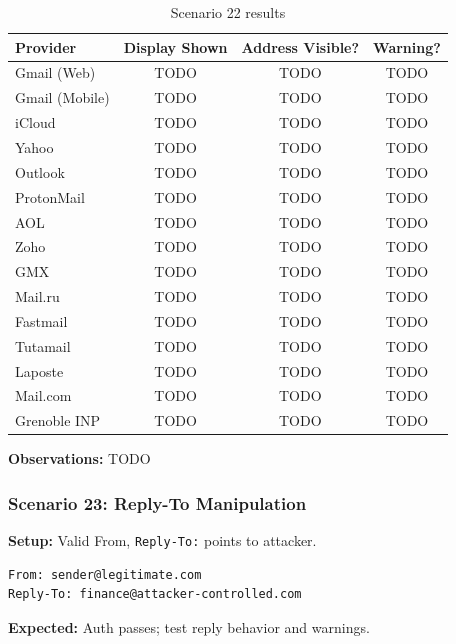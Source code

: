 \documentclass[11pt,a4paper]{article}
\begin{document}
\begin{table}[h]
\centering
\small
\begin{tabular}{lccc}
\toprule
\textbf{Provider} & \textbf{Display Shown} & \textbf{Address Visible?} & \textbf{Warning?} \\
\midrule
Gmail (Web) & TODO & TODO & TODO \\
Gmail (Mobile) & TODO & TODO & TODO \\
iCloud & TODO & TODO & TODO \\
Yahoo & TODO & TODO & TODO \\
Outlook & TODO & TODO & TODO \\
ProtonMail & TODO & TODO & TODO \\
AOL & TODO & TODO & TODO \\
Zoho & TODO & TODO & TODO \\
GMX & TODO & TODO & TODO \\
Mail.ru & TODO & TODO & TODO \\
Fastmail & TODO & TODO & TODO \\
Tutamail & TODO & TODO & TODO \\
Laposte & TODO & TODO & TODO \\
Mail.com & TODO & TODO & TODO \\
Grenoble INP & TODO & TODO & TODO \\
\bottomrule
\end{tabular}
\caption{Scenario 22 results}
\end{table}

\textbf{Observations:} TODO


\subsubsection{Scenario 23: Reply-To Manipulation}

\textbf{Setup:} Valid From, \texttt{Reply-To:} points to attacker.

\begin{lstlisting}
From: sender@legitimate.com
Reply-To: finance@attacker-controlled.com
\end{lstlisting}

\textbf{Expected:} Auth passes; test reply behavior and warnings.
\end{document}
